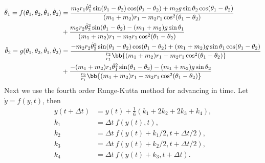\documentclass[a4paper,11pt]{article}
\begin{document}
	\begin{align*}
		\ddot{\theta}_1 = f(\theta_1, \theta_2, \dot{\theta}_1, \dot{\theta}_2) &= \frac{m_2 r_1 \dot{\theta}_1^2 \sin(\theta_1-\theta_2)\cos(\theta_1-\theta_2) + m_2g\sin\theta_2 \cos(\theta_1-\theta_2)}{(m_1+m_2)r_1 - m_2r_1\cos^2(\theta_1-\theta_2)} \\
		&+  \frac{m_2 r_2 \dot{\theta}_2^2 \sin(\theta_1-\theta_2) - (m_1+m_2)g\sin\theta_1}{(m_1+m_2)r_1 - m_2r_1\cos^2(\theta_1-\theta_2)}\\
		\ddot{\theta}_2 = g(\theta_1, \theta_2, \dot{\theta}_1, \dot{\theta}_2) &= \frac{-m_2r_2\dot{\theta}_2^2 \sin(\theta_1-\theta_2)\cos(\theta_1-\theta_2) + (m_1+m_2) g \sin\theta_1 \cos(\theta_1-\theta_2)}{\frac{r_2}{r_1} \bb{(m_1+m_2)r_1 - m_2r_1\cos^2(\theta_1-\theta_2)}} \\
		&+\frac{- (m_1+m_2) r_1 \dot{\theta}_1^2 \sin(\theta_1-\theta_2) - (m_1+m_2) g \sin\theta_2}{\frac{r_2}{r_1} \bb{(m_1+m_2)r_1 - m_2r_1\cos^2(\theta_1-\theta_2)}}
	\end{align*}
	Next we use the fourth order Runge-Kutta method for advancing in time. Let $ \dot{y}=f(y, t) $, then
	\begin{align}
		y(t + \Delta t) &= y(t) + \frac{1}{6} (k_1 + 2k_2 + 2k_3 + k_4), \\
		k_1 &= \Delta t \ f(y(t), t),\\
		k_2 &= \Delta t \ f(y(t) + k_1/2, t+\Delta t/2), \\
		k_3 &= \Delta t \ f(y(t) + k_2/2, t+\Delta t/2), \\
		k_4 &= \Delta t \ f(y(t) + k_3, t+\Delta t).
	\end{align}
\end{document}
